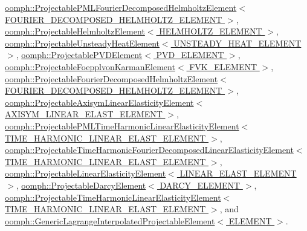 \hyperlink{classoomph_1_1ProjectablePMLFourierDecomposedHelmholtzElement_a0ff6495f24663e6f1c8a50fa75443915}{oomph\+::\+Projectable\+P\+M\+L\+Fourier\+Decomposed\+Helmholtz\+Element$<$ F\+O\+U\+R\+I\+E\+R\+\_\+\+D\+E\+C\+O\+M\+P\+O\+S\+E\+D\+\_\+\+H\+E\+L\+M\+H\+O\+L\+T\+Z\+\_\+\+E\+L\+E\+M\+E\+N\+T $>$}, \hyperlink{classoomph_1_1ProjectableHelmholtzElement_aae069d7dba3ab7ae1677053e5c55ba93}{oomph\+::\+Projectable\+Helmholtz\+Element$<$ H\+E\+L\+M\+H\+O\+L\+T\+Z\+\_\+\+E\+L\+E\+M\+E\+N\+T $>$}, \hyperlink{classoomph_1_1ProjectableUnsteadyHeatElement_ac26bb5fe73e07db80e7e4e7a2070074c}{oomph\+::\+Projectable\+Unsteady\+Heat\+Element$<$ U\+N\+S\+T\+E\+A\+D\+Y\+\_\+\+H\+E\+A\+T\+\_\+\+E\+L\+E\+M\+E\+N\+T $>$}, \hyperlink{classoomph_1_1ProjectablePVDElement_a1fe76f1370f13c75f81f8dc860240084}{oomph\+::\+Projectable\+P\+V\+D\+Element$<$ P\+V\+D\+\_\+\+E\+L\+E\+M\+E\+N\+T $>$}, \hyperlink{classoomph_1_1ProjectableFoepplvonKarmanElement_afbac2a4519a482c9a7fdc9994e783147}{oomph\+::\+Projectable\+Foepplvon\+Karman\+Element$<$ F\+V\+K\+\_\+\+E\+L\+E\+M\+E\+N\+T $>$}, \hyperlink{classoomph_1_1ProjectableFourierDecomposedHelmholtzElement_ade916dec0e853569db95b0538fcabb2a}{oomph\+::\+Projectable\+Fourier\+Decomposed\+Helmholtz\+Element$<$ F\+O\+U\+R\+I\+E\+R\+\_\+\+D\+E\+C\+O\+M\+P\+O\+S\+E\+D\+\_\+\+H\+E\+L\+M\+H\+O\+L\+T\+Z\+\_\+\+E\+L\+E\+M\+E\+N\+T $>$}, \hyperlink{classoomph_1_1ProjectableAxisymLinearElasticityElement_ac728e9dd1f32500ecabd559f4f457fd6}{oomph\+::\+Projectable\+Axisym\+Linear\+Elasticity\+Element$<$ A\+X\+I\+S\+Y\+M\+\_\+\+L\+I\+N\+E\+A\+R\+\_\+\+E\+L\+A\+S\+T\+\_\+\+E\+L\+E\+M\+E\+N\+T $>$}, \hyperlink{classoomph_1_1ProjectablePMLTimeHarmonicLinearElasticityElement_a0b75e51a7ed1b8bb56238134b2c02dae}{oomph\+::\+Projectable\+P\+M\+L\+Time\+Harmonic\+Linear\+Elasticity\+Element$<$ T\+I\+M\+E\+\_\+\+H\+A\+R\+M\+O\+N\+I\+C\+\_\+\+L\+I\+N\+E\+A\+R\+\_\+\+E\+L\+A\+S\+T\+\_\+\+E\+L\+E\+M\+E\+N\+T $>$}, \hyperlink{classoomph_1_1ProjectableTimeHarmonicFourierDecomposedLinearElasticityElement_a6ab68c3941f90a662a1b696bc7d4b3d7}{oomph\+::\+Projectable\+Time\+Harmonic\+Fourier\+Decomposed\+Linear\+Elasticity\+Element$<$ T\+I\+M\+E\+\_\+\+H\+A\+R\+M\+O\+N\+I\+C\+\_\+\+L\+I\+N\+E\+A\+R\+\_\+\+E\+L\+A\+S\+T\+\_\+\+E\+L\+E\+M\+E\+N\+T $>$}, \hyperlink{classoomph_1_1ProjectableLinearElasticityElement_a978036eab9ff96a4af083c9963f2f369}{oomph\+::\+Projectable\+Linear\+Elasticity\+Element$<$ L\+I\+N\+E\+A\+R\+\_\+\+E\+L\+A\+S\+T\+\_\+\+E\+L\+E\+M\+E\+N\+T $>$}, \hyperlink{classoomph_1_1ProjectableDarcyElement_aba5e9617dc6346ca4318baf457445da9}{oomph\+::\+Projectable\+Darcy\+Element$<$ D\+A\+R\+C\+Y\+\_\+\+E\+L\+E\+M\+E\+N\+T $>$}, \hyperlink{classoomph_1_1ProjectableTimeHarmonicLinearElasticityElement_a4615e8cf28f14603d0215006db2218fc}{oomph\+::\+Projectable\+Time\+Harmonic\+Linear\+Elasticity\+Element$<$ T\+I\+M\+E\+\_\+\+H\+A\+R\+M\+O\+N\+I\+C\+\_\+\+L\+I\+N\+E\+A\+R\+\_\+\+E\+L\+A\+S\+T\+\_\+\+E\+L\+E\+M\+E\+N\+T $>$}, and \hyperlink{classoomph_1_1GenericLagrangeInterpolatedProjectableElement_a9343241dc18e1331a5b220fd3fbe07a7}{oomph\+::\+Generic\+Lagrange\+Interpolated\+Projectable\+Element$<$ E\+L\+E\+M\+E\+N\+T $>$}.



